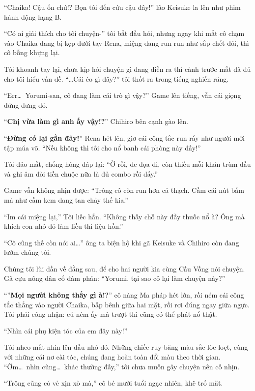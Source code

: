 \documentclass[../main.tex]{subfiles}
\begin{document}
``Chaika! Cậu ổn chứ!? Bọn tôi đến cứu cậu đây!'' lão Keisuke la lên như phim hành động hạng B.

``Có ai giải thích cho tôi chuyện-'' tôi bắt đầu hỏi, nhưng ngay khi mắt cô chạm vào Chaika đang bị kẹp dưới tay Rena, miệng đang run run như sắp chết đói, thì cô bỗng khựng lại.

Tôi khoanh tay lại, chưa kịp hỏi chuyện gì đang diễn ra thì cảnh trước mắt đã đủ cho tôi hiểu vấn đề. ``\dots Cái éo gì đây?'' tôi thốt ra trong tiếng nghiến răng.

``Err\dots\ Yorumi-san, cô đang làm cái trò gì vậy?'' Game lên tiếng, vẫn cái giọng dửng dưng đó.

``\textbf{Chị vừa làm gì anh ấy vậy!?}'' Chihiro bên cạnh gào lên.

``\textbf{Đừng có lại gần đây!}'' Rena hét lên, giơ cái công tắc run rẩy như người mới tập múa võ. ``Nếu không thì tôi cho nổ banh cái phòng này đấy!''

Tôi đảo mắt, chống hông đáp lại: ``Ờ rồi, đe dọa đi, còn thiếu mỗi khăn trùm đầu và ghi âm đòi tiền chuộc nữa là đủ combo rồi đấy.''

Game vẫn không nhịn được: ``Trông cô còn run hơn cả thạch. Cầm cái nút bấm mà như cầm kem đang tan chảy thế kia.''

``Im cái miệng lại,'' Tôi liếc hắn. ``Không thấy chỗ này đầy thuốc nổ à? Ông mà khích con nhỏ đó làm liều thì liệu hồn.''

``Cô cũng thế còn nói ai\dots'' ông ta biện hộ khi gã Keisuke và Chihiro còn đang lườm chúng tôi.

Chúng tôi lùi dần về đằng sau, để cho hai người kia cùng Cầu Vồng nói chuyện. Gã cựu nông dân cố đàm phán: ``Yorumi, tại sao cô lại làm chuyện này?''


``''\textbf{Mọi người không thấy gì à!?}'' cô nàng Ma pháp hét lớn, rồi ném cái công tắc thẳng vào người Chaika, bấp bênh giữa hai mặt, rồi rơi đúng ngay giữa ngực. Tôi phải công nhận: cú ném ấy mà trượt thì cũng có thể phát nổ thật.

``Nhìn cái phụ kiện tóc của em đây này!''

Tôi nheo mắt nhìn lên đầu nhỏ đó. Những chiếc ruy-băng màu sắc lòe loẹt, cùng với những cái nơ cài tóc, chúng đang hoàn toàn đổi màu theo thời gian. ``Ờm\dots\ nhìn cũng\dots\ khác thường đấy,'' tôi chưa muốn gây chuyện nên cố nhịn.


``Trông cũng có vẻ xịn xò mà,'' cô bé mười tuổi ngạc nhiên, khẽ trố măt.
\end{document}
